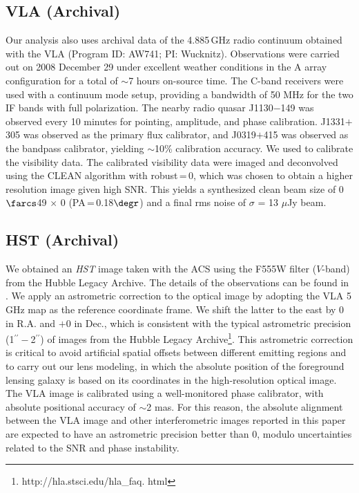 \documentclass[]{emulateapj}
\begin{document}
\subsection{VLA (Archival)}
Our analysis also uses archival data of the 4.885\,GHz
radio continuum obtained with the
VLA (Program ID: AW741; PI: Wucknitz).
Observations were carried out on 2008 December 29 under excellent weather
conditions in the A array configuration for a total of $\sim$7 hours on-source time. The C-band receivers were used with a continuum mode setup,
providing a bandwidth of 50 MHz for the two IF bands with full polarization.
The nearby radio quasar J1130$-$149 was observed every 10 minutes for
pointing, amplitude, and phase calibration. J1331$+$305 was observed as the
primary flux calibrator, and J0319$+$415 was observed as the bandpass
calibrator, yielding $\sim$10\% calibration accuracy.
We used  to calibrate the visibility data.
The calibrated visibility data were imaged and deconvolved using
the CLEAN algorithm with robust\,=\,0, which
was chosen to obtain a higher resolution image given high SNR.
This yields a synthesized clean
beam size of 0$\farcs$49 $\times$ 0 (PA\,=\,0.18$\degr$) and a final
rms noise of $\sigma$ = 13 $\mu$Jy beam\pmOne.

\subsection{HST (Archival)}
We obtained an {\it HST} image taken with
the ACS
using the F555W filter ($V$-band)
from the
Hubble Legacy Archive.
The details of the observations can be found
in .
We apply an astrometric correction to the optical image by adopting the VLA 5\,GHz map as the
reference coordinate frame.
We shift the latter to the east by 0 in R.A. and $+$0 in
Dec., which is consistent with the typical astrometric precision (1$^{\prime\prime}-$2$^{\prime\prime}$) of
images from the Hubble Legacy Archive\footnote{http://hla.stsci.edu/hla\_faq.
html}. This astrometric correction is critical to avoid artificial spatial
offsets between different emitting regions and to carry out our lens modeling,
in which the absolute position of the foreground lensing galaxy is based on
its coordinates in the high-resolution optical image.
The VLA image is calibrated using a well-monitored phase
calibrator, with absolute positional accuracy of $\sim$2 mas.
For this reason, the absolute alignment between the VLA image and other
interferometric images reported in this paper are expected to have an astrometric
precision better than 0, modulo uncertainties related to the SNR and phase
instability.
\end{document}
